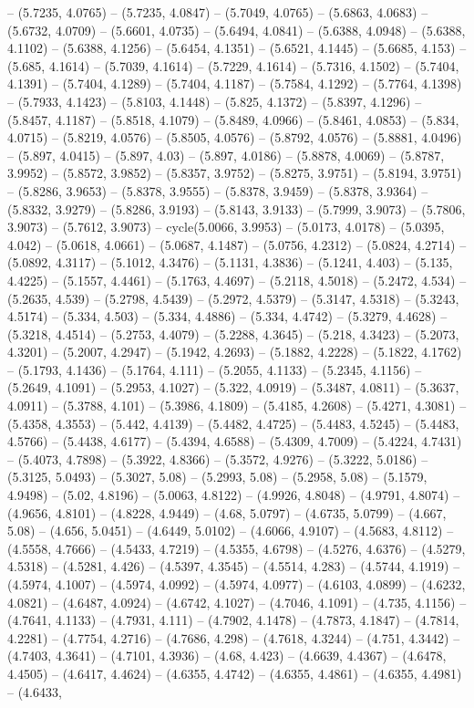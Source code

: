 -- (5.7235, 4.0765) -- (5.7235, 4.0847) -- (5.7049, 4.0765) -- (5.6863, 4.0683) -- (5.6732, 4.0709) -- (5.6601, 4.0735) -- (5.6494, 4.0841) -- (5.6388, 4.0948) -- (5.6388, 4.1102) -- (5.6388, 4.1256) -- (5.6454, 4.1351) -- (5.6521, 4.1445) -- (5.6685, 4.153) -- (5.685, 4.1614) -- (5.7039, 4.1614) -- (5.7229, 4.1614) -- (5.7316, 4.1502) -- (5.7404, 4.1391) -- (5.7404, 4.1289) -- (5.7404, 4.1187) -- (5.7584, 4.1292) -- (5.7764, 4.1398) -- (5.7933, 4.1423) -- (5.8103, 4.1448) -- (5.825, 4.1372) -- (5.8397, 4.1296) -- (5.8457, 4.1187) -- (5.8518, 4.1079) -- (5.8489, 4.0966) -- (5.8461, 4.0853) -- (5.834, 4.0715) -- (5.8219, 4.0576) -- (5.8505, 4.0576) -- (5.8792, 4.0576) -- (5.8881, 4.0496) -- (5.897, 4.0415) -- (5.897, 4.03) -- (5.897, 4.0186) -- (5.8878, 4.0069) -- (5.8787, 3.9952) -- (5.8572, 3.9852) -- (5.8357, 3.9752) -- (5.8275, 3.9751) -- (5.8194, 3.9751) -- (5.8286, 3.9653) -- (5.8378, 3.9555) -- (5.8378, 3.9459) -- (5.8378, 3.9364) -- (5.8332, 3.9279) -- (5.8286, 3.9193) -- (5.8143, 3.9133) -- (5.7999, 3.9073) -- (5.7806, 3.9073) -- (5.7612, 3.9073) -- cycle(5.0066, 3.9953) -- (5.0173, 4.0178) -- (5.0395, 4.042) -- (5.0618, 4.0661) -- (5.0687, 4.1487) -- (5.0756, 4.2312) -- (5.0824, 4.2714) -- (5.0892, 4.3117) -- (5.1012, 4.3476) -- (5.1131, 4.3836) -- (5.1241, 4.403) -- (5.135, 4.4225) -- (5.1557, 4.4461) -- (5.1763, 4.4697) -- (5.2118, 4.5018) -- (5.2472, 4.534) -- (5.2635, 4.539) -- (5.2798, 4.5439) -- (5.2972, 4.5379) -- (5.3147, 4.5318) -- (5.3243, 4.5174) -- (5.334, 4.503) -- (5.334, 4.4886) -- (5.334, 4.4742) -- (5.3279, 4.4628) -- (5.3218, 4.4514) -- (5.2753, 4.4079) -- (5.2288, 4.3645) -- (5.218, 4.3423) -- (5.2073, 4.3201) -- (5.2007, 4.2947) -- (5.1942, 4.2693) -- (5.1882, 4.2228) -- (5.1822, 4.1762) -- (5.1793, 4.1436) -- (5.1764, 4.111) -- (5.2055, 4.1133) -- (5.2345, 4.1156) -- (5.2649, 4.1091) -- (5.2953, 4.1027) -- (5.322, 4.0919) -- (5.3487, 4.0811) -- (5.3637, 4.0911) -- (5.3788, 4.101) -- (5.3986, 4.1809) -- (5.4185, 4.2608) -- (5.4271, 4.3081) -- (5.4358, 4.3553) -- (5.442, 4.4139) -- (5.4482, 4.4725) -- (5.4483, 4.5245) -- (5.4483, 4.5766) -- (5.4438, 4.6177) -- (5.4394, 4.6588) -- (5.4309, 4.7009) -- (5.4224, 4.7431) -- (5.4073, 4.7898) -- (5.3922, 4.8366) -- (5.3572, 4.9276) -- (5.3222, 5.0186) -- (5.3125, 5.0493) -- (5.3027, 5.08) -- (5.2993, 5.08) -- (5.2958, 5.08) -- (5.1579, 4.9498) -- (5.02, 4.8196) -- (5.0063, 4.8122) -- (4.9926, 4.8048) -- (4.9791, 4.8074) -- (4.9656, 4.8101) -- (4.8228, 4.9449) -- (4.68, 5.0797) -- (4.6735, 5.0799) -- (4.667, 5.08) -- (4.656, 5.0451) -- (4.6449, 5.0102) -- (4.6066, 4.9107) -- (4.5683, 4.8112) -- (4.5558, 4.7666) -- (4.5433, 4.7219) -- (4.5355, 4.6798) -- (4.5276, 4.6376) -- (4.5279, 4.5318) -- (4.5281, 4.426) -- (4.5397, 4.3545) -- (4.5514, 4.283) -- (4.5744, 4.1919) -- (4.5974, 4.1007) -- (4.5974, 4.0992) -- (4.5974, 4.0977) -- (4.6103, 4.0899) -- (4.6232, 4.0821) -- (4.6487, 4.0924) -- (4.6742, 4.1027) -- (4.7046, 4.1091) -- (4.735, 4.1156) -- (4.7641, 4.1133) -- (4.7931, 4.111) -- (4.7902, 4.1478) -- (4.7873, 4.1847) -- (4.7814, 4.2281) -- (4.7754, 4.2716) -- (4.7686, 4.298) -- (4.7618, 4.3244) -- (4.751, 4.3442) -- (4.7403, 4.3641) -- (4.7101, 4.3936) -- (4.68, 4.423) -- (4.6639, 4.4367) -- (4.6478, 4.4505) -- (4.6417, 4.4624) -- (4.6355, 4.4742) -- (4.6355, 4.4861) -- (4.6355, 4.4981) -- (4.6433, 